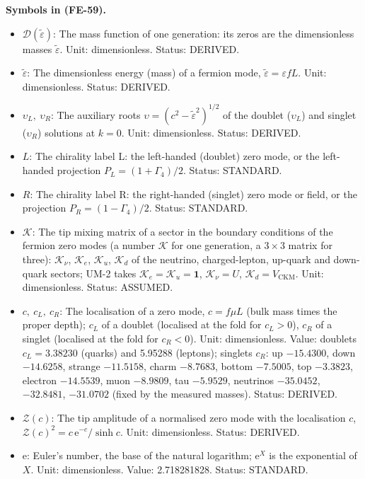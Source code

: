 \documentclass[
  10pt,
]{article}
\providecommand{\tightlist}{%
  \setlength{\itemsep}{0pt}\setlength{\parskip}{0pt}}
\begin{document}
\textbf{Symbols in (FE-59).}

\begin{itemize}
\tightlist
\item
  \(\mathcal{D}(\tilde\varepsilon)\): The mass function of one
  generation: its zeros are the dimensionless masses
  \(\tilde\varepsilon\). Unit: dimensionless. Status: DERIVED.
\item
  \(\tilde\varepsilon\): The dimensionless energy (mass) of a fermion
  mode, \(\tilde\varepsilon = \varepsilon fL\). Unit: dimensionless.
  Status: DERIVED.
\item
  \(\upsilon_L,\ \upsilon_R\): The auxiliary roots
  \(\upsilon = (c^2 - \tilde\varepsilon^2)^{1/2}\) of the doublet
  (\(\upsilon_L\)) and singlet (\(\upsilon_R\)) solutions at \(k = 0\).
  Unit: dimensionless. Status: DERIVED.
\item
  \(L\): The chirality label L: the left-handed (doublet) zero mode, or
  the left-handed projection \(P_L = (1 + \Gamma_4)/2\). Status:
  STANDARD.
\item
  \(R\): The chirality label R: the right-handed (singlet) zero mode or
  field, or the projection \(P_R = (1 - \Gamma_4)/2\). Status: STANDARD.
\item
  \(\mathcal{K}\): The tip mixing matrix of a sector in the boundary
  conditions of the fermion zero modes (a number \(\mathcal{K}\) for one
  generation, a \(3 \times 3\) matrix for three): \(\mathcal{K}_\nu\),
  \(\mathcal{K}_e\), \(\mathcal{K}_u\), \(\mathcal{K}_d\) of the
  neutrino, charged-lepton, up-quark and down-quark sectors; UM-2 takes
  \(\mathcal{K}_e = \mathcal{K}_u = \mathbf{1}\),
  \(\mathcal{K}_\nu = U\), \(\mathcal{K}_d = V_{\mathrm{CKM}}\). Unit:
  dimensionless. Status: ASSUMED.
\item
  \(c,\ c_L,\ c_R\): The localisation of a zero mode, \(c = f\mu L\)
  (bulk mass times the proper depth); \(c_L\) of a doublet (localised at
  the fold for \(c_L > 0\)), \(c_R\) of a singlet (localised at the fold
  for \(c_R < 0\)). Unit: dimensionless. Value: doublets
  \(c_L = 3.38230\) (quarks) and 5.95288 (leptons); singlets \(c_R\): up
  \(-15.4300\), down \(-14.6258\), strange \(-11.5158\), charm
  \(-8.7683\), bottom \(-7.5005\), top \(-3.3823\), electron
  \(-14.5539\), muon \(-8.9809\), tau \(-5.9529\), neutrinos
  \(-35.0452\), \(-32.8481\), \(-31.0702\) (fixed by the measured
  masses). Status: DERIVED.
\item
  \(\mathcal{Z}(c)\): The tip amplitude of a normalised zero mode with
  the localisation \(c\),
  \(\mathcal{Z}(c)^2 = c\,\mathrm{e}^{-c}/\sinh c\). Unit:
  dimensionless. Status: DERIVED.
\item
  \(\mathrm{e}\): Euler's number, the base of the natural logarithm;
  \(\mathrm{e}^{X}\) is the exponential of \(X\). Unit: dimensionless.
  Value: 2.718281828. Status: STANDARD.
\end{itemize}
\end{document}
